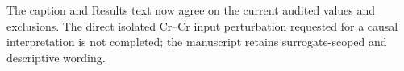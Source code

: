 The caption and Results text now agree on the current audited values and exclusions. The direct isolated Cr--Cr input perturbation requested for a causal interpretation is not completed; the manuscript retains surrogate-scoped and descriptive wording.
